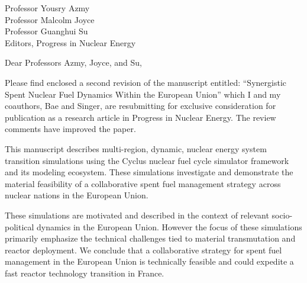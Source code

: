 \documentclass[11pt]{letter} %
\begin{document}


\begin{letter}{Professor Yousry Azmy\\
Professor Malcolm Joyce\\
Professor Guanghui Su\\
Editors, Progress in Nuclear Energy}


\address{Kathryn D. Huff\\
kdhuff@illinois.edu\\
118 Talbot Laboratory\\
MC-234\\
104 S. Wright Street\\
Urbana, IL 61801}



\opening{Dear Professors Azmy, Joyce, and Su,}

Please find enclosed a second revision of the manuscript entitled: ``Synergistic Spent Nuclear Fuel 
Dynamics Within the European Union'' which I and my coauthors, Bae and Singer, 
are resubmitting for exclusive consideration for publication as a research 
article in Progress in Nuclear Energy. The review comments have improved the 
paper.

This manuscript describes multi-region, dynamic, nuclear energy system transition 
simulations using the Cyclus nuclear fuel cycle simulator framework and its 
modeling ecosystem. These simulations investigate and demonstrate the material 
feasibility of a collaborative spent fuel management strategy across nuclear 
nations in the European Union.  

These simulations are motivated and described in the context of relevant
socio-political dynamics in the European Union. However the focus of these
simulations primarily emphasize the technical challenges tied to material transmutation
and reactor deployment. We conclude that a collaborative strategy for spent 
fuel management in the European Union is technically feasible and could 
expedite a fast reactor technology transition in France.


\end{letter}
\end{document}
